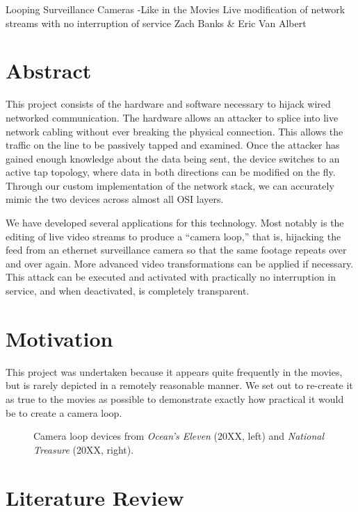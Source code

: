 \documentclass[12pt]{article}
\begin{document}
Looping Surveillance Cameras -Like in the Movies
Live modification of network streams with no interruption of service
Zach Banks \& Eric Van Albert

\newpage

\section{Abstract}
This project consists of the hardware and software necessary to hijack wired networked communication. The hardware allows an attacker to splice into live network cabling without ever breaking the physical connection. This allows the traffic on the line to be passively tapped and examined. Once the attacker has gained enough knowledge about the data being sent, the device switches to an active tap topology, where data in both directions can be modified on the fly. Through our custom implementation of the network stack, we can accurately mimic the two devices across almost all OSI layers.

We have developed several applications for this technology. Most notably is the editing of live video streams to produce a “camera loop,” that is, hijacking the feed from an ethernet surveillance camera so that the same footage repeats over and over again. More advanced video transformations can be applied if necessary. This attack can be executed and activated with practically no interruption in service, and when deactivated, is completely transparent.

\section{Motivation}
This project was undertaken because it appears quite frequently in the movies, but is rarely depicted in a remotely reasonable manner. We set out to re-create it as true to the movies as possible to demonstrate exactly how practical it would be to create a camera loop.

\begin{figure}[h!]
    \centering
    \caption{Camera loop devices from \textit{Ocean’s Eleven} (20XX, left) and \textit{National Treasure} (20XX, right).} %
\end{figure}

\section{Literature Review}
\end{document}
